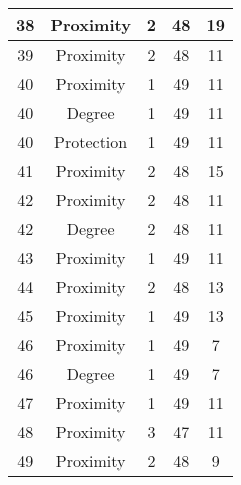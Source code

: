 \documentclass[results.tex]{subfiles}
\begin{document}
\begin{center}
\begin{tabular}{| c || c | c | c | c |}
    \hline
    38 & Proximity & 2 & 48 & 19 \\ 
    \hline
    39 & Proximity & 2 & 48 & 11 \\ 
    \hline
    40 & Proximity & 1 & 49 & 11 \\ 
    \hline
    40 & Degree & 1 & 49 & 11 \\ 
    \hline
    40 & Protection & 1 & 49 & 11 \\ 
    \hline
    41 & Proximity & 2 & 48 & 15 \\ 
    \hline
    42 & Proximity & 2 & 48 & 11 \\ 
    \hline
    42 & Degree & 2 & 48 & 11 \\ 
    \hline
    43 & Proximity & 1 & 49 & 11 \\ 
    \hline
    44 & Proximity & 2 & 48 & 13 \\ 
    \hline
    45 & Proximity & 1 & 49 & 13 \\ 
    \hline
    46 & Proximity & 1 & 49 & 7 \\ 
    \hline
    46 & Degree & 1 & 49 & 7 \\ 
    \hline
    47 & Proximity & 1 & 49 & 11 \\ 
    \hline
    48 & Proximity & 3 & 47 & 11 \\ 
    \hline
    49 & Proximity & 2 & 48 & 9 \\ 
    \hline   \end{tabular}
\end{center}
\end{document}
